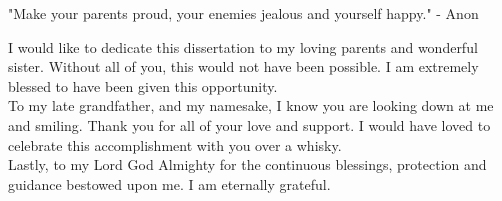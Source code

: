 
\begin{dedication} 

\begin{displayquote}
"Make your parents proud, your enemies jealous and yourself happy." - Anon
\end{displayquote}
I would like to dedicate this dissertation to my loving parents and wonderful sister. Without all of you, this would not have been possible. I am extremely blessed to have been given this opportunity. \\
To my late grandfather, and my namesake, I know you are looking down at me and smiling. Thank you for all of your love and support. I would have loved to celebrate this accomplishment with you over a whisky.\\ 
Lastly, to my Lord God Almighty for the continuous blessings, protection and guidance bestowed upon me. I am eternally grateful.\\


\end{dedication}

